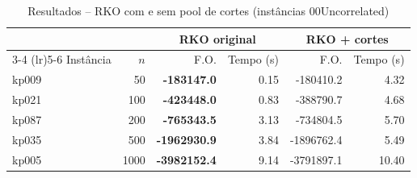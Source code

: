 \begin{table}[htbp]
\centering
\caption{Resultados -- RKO com e sem pool de cortes (instâncias 00Uncorrelated)}
\label{tab:cuts}
\begin{tabular}{lrrrrr}
\toprule
 & & \multicolumn{2}{c}{\textbf{RKO original}} & \multicolumn{2}{c}{\textbf{RKO + cortes}} \\
\cmidrule(lr){3-4} \cmidrule(lr){5-6}
Instância & $n$ & F.O. & Tempo (s) & F.O. & Tempo (s) \\
\midrule
kp009 & 50 & \textbf{-183147.0} & 0.15 & -180410.2 & 4.32 \\
kp021 & 100 & \textbf{-423448.0} & 0.83 & -388790.7 & 4.68 \\
kp087 & 200 & \textbf{-765343.5} & 3.13 & -734804.5 & 5.70 \\
kp035 & 500 & \textbf{-1962930.9} & 3.84 & -1896762.4 & 5.49 \\
kp005 & 1000 & \textbf{-3982152.4} & 9.14 & -3791897.1 & 10.40 \\
\bottomrule
\end{tabular}
\end{table}
